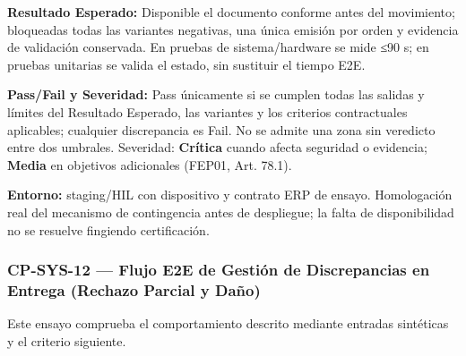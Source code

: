 \par\noindent\textbf{Resultado Esperado:} Disponible el documento conforme antes del movimiento; bloqueadas todas las variantes negativas, una única emisión por orden y evidencia de validación conservada. En pruebas de sistema/hardware se mide ≤90 s; en pruebas unitarias se valida el estado, sin sustituir el tiempo E2E.\par
\par\noindent\textbf{Pass/Fail y Severidad:} Pass únicamente si se cumplen todas las salidas y límites del Resultado Esperado, las variantes y los criterios contractuales aplicables; cualquier discrepancia es Fail. No se admite una zona sin veredicto entre dos umbrales. Severidad: \textbf{Crítica} cuando afecta seguridad o evidencia; \textbf{Media} en objetivos adicionales (FEP01, Art. 78.1).\par
\par\noindent\textbf{Entorno:} staging/HIL con dispositivo y contrato ERP de ensayo. Homologación real del mecanismo de contingencia antes de despliegue; la falta de disponibilidad no se resuelve fingiendo certificación.\par

\subsubsection*{CP-SYS-12 — Flujo E2E de Gestión de Discrepancias en Entrega (Rechazo Parcial y Daño)}\label{sec:9-cp-sys-12}
Este ensayo comprueba el comportamiento descrito mediante entradas sintéticas y el criterio siguiente.

